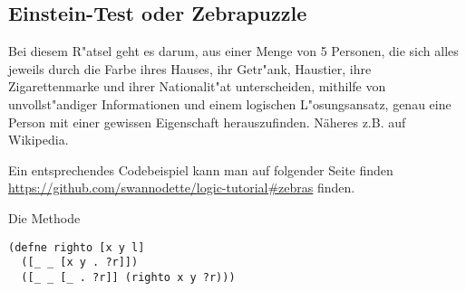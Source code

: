 \subsection{Einstein-Test oder Zebrapuzzle}

Bei diesem R"atsel geht es darum, aus einer Menge von 5 Personen, die sich alles jeweils durch die Farbe ihres Hauses, ihr Getr"ank, Haustier, ihre Zigarettenmarke und ihrer Nationalit"at unterscheiden, mithilfe von unvollst"andiger Informationen und einem logischen L"osungsansatz, genau eine Person mit einer gewissen Eigenschaft herauszufinden. Näheres z.B. auf Wikipedia.

Ein entsprechendes Codebeispiel kann man auf folgender Seite finden \url{https://github.com/swannodette/logic-tutorial#zebras} finden.

Die Methode 

\begin{lstlisting}
(defne righto [x y l]
  ([_ _ [x y . ?r]])
  ([_ _ [_ . ?r]] (righto x y ?r)))
\end{lstlisting}
